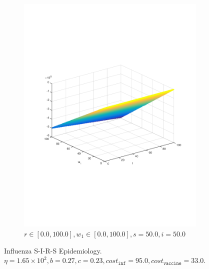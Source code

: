 \begin{figure}[t!]
    \begin{subfigure}[b]{0.4\textwidth}
        \includegraphics[width=\linewidth, height=0.8\linewidth]{images/sir_r_w1}
        \caption{$ r \in \left[ 0.0, 100.0 \right], w_1 \in \left[ 0.0, 100.0 \right], s = 50.0, i = 50.0$}
        \label{fig:sir_r_w1}
    \end{subfigure}      
    \caption{Influenza S-I-R-S Epidemiology. $ \eta = 1.65 \times 10^2, b = 0.27, c = 0.23, cost_{\mathtt{inf}} = 95.0, cost_{\mathtt{vaccine}} = 33.0$.}
    \label{fig:sir}
\end{figure}
    
